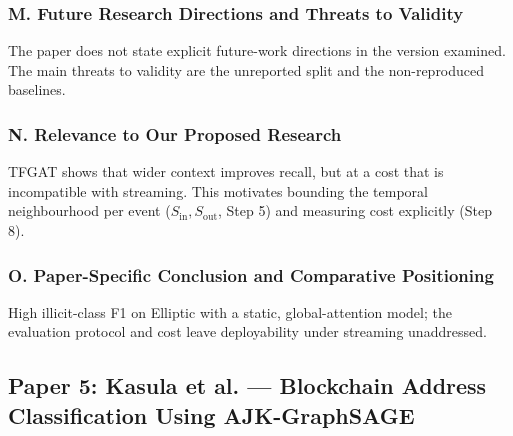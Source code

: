 \documentclass[11pt,a4paper]{article}
\begin{document}
\subsubsection*{M. Future Research Directions and Threats to Validity}
The paper does not state explicit future-work directions in the version examined. The main threats to validity are the unreported split and the non-reproduced baselines.

\subsubsection*{N. Relevance to Our Proposed Research}
TFGAT shows that wider context improves recall, but at a cost that is incompatible with streaming. This motivates bounding the temporal neighbourhood per event ($S_{\text{in}}, S_{\text{out}}$, Step 5) and measuring cost explicitly (Step 8).

\subsubsection*{O. Paper-Specific Conclusion and Comparative Positioning}
High illicit-class F1 on Elliptic with a static, global-attention model; the evaluation protocol and cost leave deployability under streaming unaddressed.

\subsection{Paper 5: Kasula et al. --- Blockchain Address Classification Using AJK-GraphSAGE}
\label{sec:p5_kasula}
\end{document}
